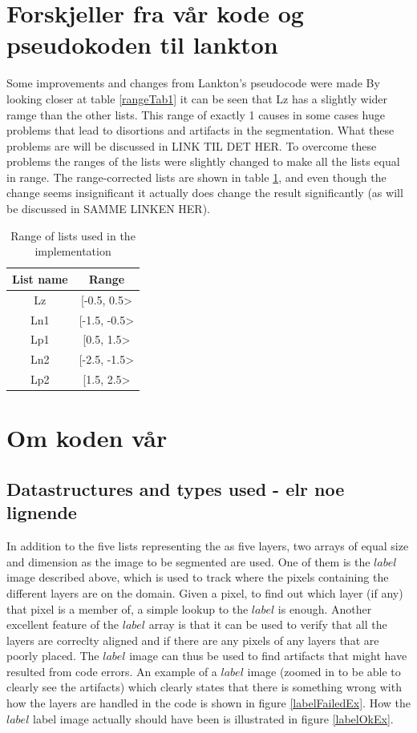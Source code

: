 \section{Forskjeller fra vår kode og pseudokoden til lankton}
Some improvements and changes from Lankton's pseudocode were made
By looking closer at table \ref{rangeTab1} it can be seen that Lz has a slightly wider ramge than the other lists. This range of exactly 1 causes in some cases huge problems that lead to disortions and artifacts in the segmentation. What these problems are will be discussed in LINK TIL DET HER. To overcome these problems the ranges of the lists were slightly changed to make all the lists equal in range. The range-corrected lists are shown in table \ref{rangeTab2}, and even though the change seems insignificant it actually does change the result significantly (as will be discussed in SAMME LINKEN HER).

\begin{table}[h] %
	\begin{tabular}{| c | c |} 
	\hline
	List name & Range\\
	\hline
	Lz & [-0.5, 0.5>\\
	Ln1 & [-1.5, -0.5>\\
	Lp1 & [0.5, 1.5>\\
	Ln2 & [-2.5, -1.5>\\
	Lp2 & [1.5, 2.5>\\
	\hline
	\end{tabular}
	\caption{Range of lists used in the implementation}
	\label{rangeTab2}
\end{table}

\section{Om koden vår}
\subsection{Datastructures and types used - elr noe lignende}
In addition to the five lists representing the as five layers, two arrays of equal size and dimension as the image to be segmented are used. One of them is the $label$ image described above, which is used to track where the pixels containing the different layers are on the domain. Given a pixel, to find out which layer (if any) that pixel is a member of, a simple lookup to the $label$ is enough. Another excellent feature of the $label$ array is that it can be used to verify that all the layers are correclty aligned and if there are any pixels of any layers that are poorly placed. The $label$ image can thus be used to find artifacts that might have resulted from code errors. An example of a $label$ image (zoomed in to be able to clearly see the artifacts) which clearly states that there is something wrong with how the layers are handled in the code is shown in figure \ref{labelFailedEx}. How the $label$ label image actually should have been is illustrated in figure \ref{labelOkEx}.

